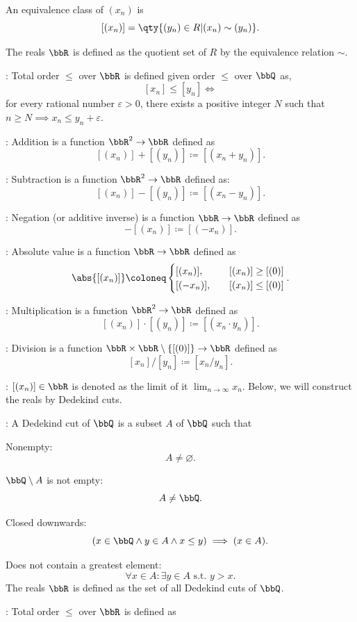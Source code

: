 \documentclass[a4paper,12pt]{article}
\begin{document}
An equivalence class of $(x_n)$ is
\[[(x_n)]=\qty\{(y_n)\in R|(x_n)\sim(y_n)\}.\]

The reals $\bbR$ is defined as the quotient set of $R$ by the equivalence relation $\sim$.
\item {}: Total order $\leq$ over $\bbR$ is defined given order $\leq$ over $\bbQ$ as,
\[[x_n]\leq[y_n]\iff\]
for every rational number $\varepsilon>0$, there exists a positive integer $N$ such that $n\geq N\implies x_n\leq y_n+\varepsilon$.
\item {}: Addition is a function $\bbR^2\to\bbR$ defined as
\[[(x_n)]+[(y_n)]\coloneq[(x_n+y_n)].\]
\item {}: Subtraction is a function $\bbR^2\to\bbR$ defined as:
\[[(x_n)]-[(y_n)]\coloneq[(x_n-y_n)].\]
\item {}: Negation (or additive inverse) is a function $\bbR\to\bbR$ defined as
\[-[(x_n)]\coloneq[(-x_n)].\]
\item {}: Absolute value is a function $\bbR\to\bbR$ defined as
\[\abs{[(x_n)]}\coloneq\begin{cases}[(x_n)],\quad&[(x_n)]\geq [(0)]\\
[(-x_n)],\quad&[(x_n)]\leq [(0)]\end{cases}.\]
\item {}: Multiplication is a function $\bbR^2\to\bbR$ defined as
\[[(x_n)]\cdot[(y_n)]\coloneq[(x_n\cdot y_n)].\]
\item {}: Division is a function $\bbR\times\bbR\setminus\{[(0)]\}\to\bbR$ defined as
\[[x_n]/[y_n]\coloneq[x_n/y_n].\]
\item {}: $[(x_n)]\in\bbR$ is denoted as the limit of it $\lim_{n\to\infty}x_n$.
\eit
{}
Below, we will construct the reals by Dedekind cuts.
\bit
\item {}: A Dedekind cut of $\bbQ$ is a subset $A$ of $\bbQ$ such that
\bit
\item Nonempty:
\[A\neq\varnothing.\]
\item $\bbQ\setminus A$ is not empty:
\[A\neq\bbQ.\]
\item Closed downwards:
\[(x\in\bbQ\land y\in A\land x\leq y)\implies (x\in A).\]
\item Does not contain a greatest element:
\[\forall x\in A\colon\exists y\in A\text{\ s.t.\ }y>x.\]
\eit
The reals $\bbR$ is defined as the set of all Dedekind cuts of $\bbQ$.
\item {}: Total order $\leq$ over $\bbR$ is defined as
\end{document}
